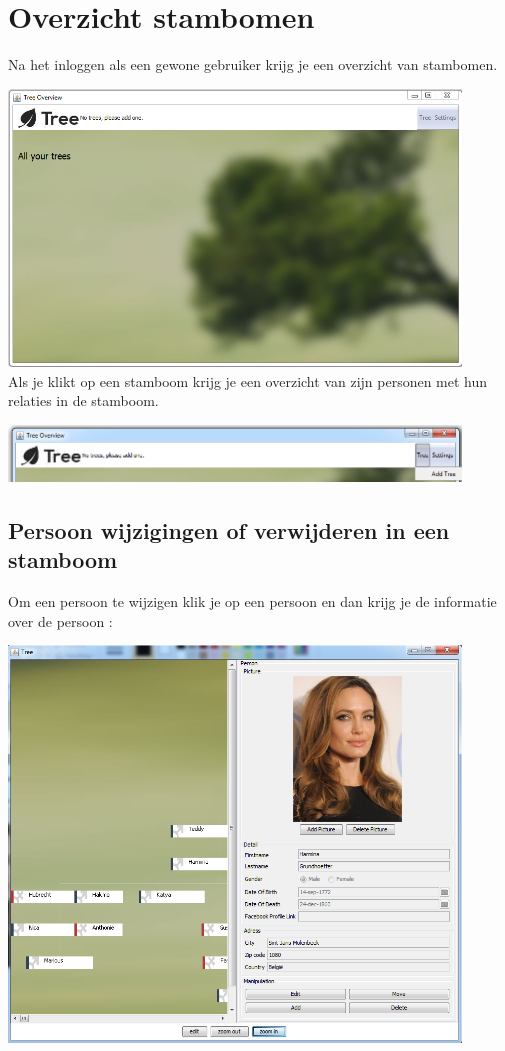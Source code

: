 \documentclass[pdftex,a4paper,12pt,twoside]{report}
\begin{document}
\section{Overzicht stambomen}\label{ch:preface}

Na het inloggen als een gewone gebruiker krijg je een overzicht van stambomen.

\includegraphics[width=12cm]{images/user_treeoverview.png}\\[.5cm]

Als je klikt op een stamboom krijg je een overzicht van zijn personen met hun relaties in de stamboom.

\includegraphics[width=12cm]{images/tree_add.png}\\[.5cm]

\subsection{Persoon wijzigingen of verwijderen in een stamboom }
Om een persoon te wijzigen klik je op een persoon en dan krijg je de informatie over de persoon :

\includegraphics[width=12cm]{images/tree_person.png}\\[.5cm]
\end{document}
